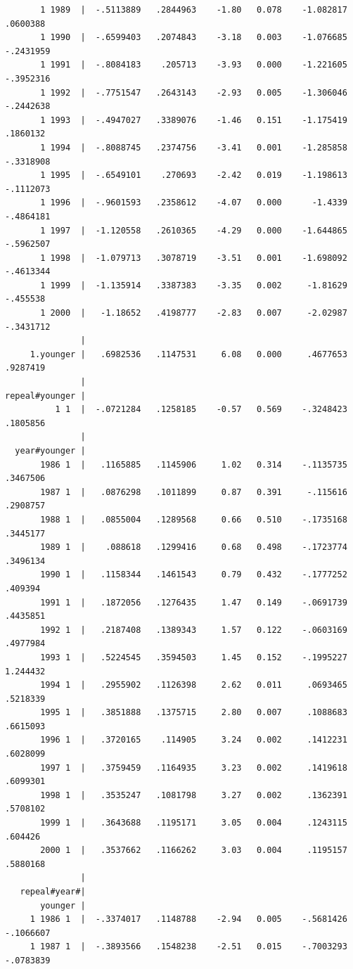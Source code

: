 \documentclass[
]{book}
\begin{document}
\begin{verbatim}
       1 1989  |  -.5113889   .2844963    -1.80   0.078    -1.082817    .0600388
       1 1990  |  -.6599403   .2074843    -3.18   0.003    -1.076685   -.2431959
       1 1991  |  -.8084183    .205713    -3.93   0.000    -1.221605   -.3952316
       1 1992  |  -.7751547   .2643143    -2.93   0.005    -1.306046   -.2442638
       1 1993  |  -.4947027   .3389076    -1.46   0.151    -1.175419    .1860132
       1 1994  |  -.8088745   .2374756    -3.41   0.001    -1.285858   -.3318908
       1 1995  |  -.6549101    .270693    -2.42   0.019    -1.198613   -.1112073
       1 1996  |  -.9601593   .2358612    -4.07   0.000      -1.4339   -.4864181
       1 1997  |  -1.120558   .2610365    -4.29   0.000    -1.644865   -.5962507
       1 1998  |  -1.079713   .3078719    -3.51   0.001    -1.698092   -.4613344
       1 1999  |  -1.135914   .3387383    -3.35   0.002     -1.81629    -.455538
       1 2000  |   -1.18652   .4198777    -2.83   0.007     -2.02987   -.3431712
               |
     1.younger |   .6982536   .1147531     6.08   0.000     .4677653    .9287419
               |
repeal#younger |
          1 1  |  -.0721284   .1258185    -0.57   0.569    -.3248423    .1805856
               |
  year#younger |
       1986 1  |   .1165885   .1145906     1.02   0.314    -.1135735    .3467506
       1987 1  |   .0876298   .1011899     0.87   0.391     -.115616    .2908757
       1988 1  |   .0855004   .1289568     0.66   0.510    -.1735168    .3445177
       1989 1  |    .088618   .1299416     0.68   0.498    -.1723774    .3496134
       1990 1  |   .1158344   .1461543     0.79   0.432    -.1777252     .409394
       1991 1  |   .1872056   .1276435     1.47   0.149    -.0691739    .4435851
       1992 1  |   .2187408   .1389343     1.57   0.122    -.0603169    .4977984
       1993 1  |   .5224545   .3594503     1.45   0.152    -.1995227    1.244432
       1994 1  |   .2955902   .1126398     2.62   0.011     .0693465    .5218339
       1995 1  |   .3851888   .1375715     2.80   0.007     .1088683    .6615093
       1996 1  |   .3720165    .114905     3.24   0.002     .1412231    .6028099
       1997 1  |   .3759459   .1164935     3.23   0.002     .1419618    .6099301
       1998 1  |   .3535247   .1081798     3.27   0.002     .1362391    .5708102
       1999 1  |   .3643688   .1195171     3.05   0.004     .1243115     .604426
       2000 1  |   .3537662   .1166262     3.03   0.004     .1195157    .5880168
               |
   repeal#year#|
       younger |
     1 1986 1  |  -.3374017   .1148788    -2.94   0.005    -.5681426   -.1066607
     1 1987 1  |  -.3893566   .1548238    -2.51   0.015    -.7003293   -.0783839

\end{verbatim}
\end{document}
